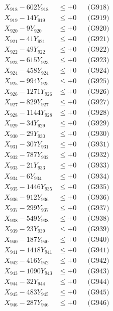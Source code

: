 \documentclass[a4paper,10pt]{article}
\begin{document}
{\begin{align}
X_{918} - 602Y_{918} &\leq +0 && \text{(G918)} \\
X_{919} - 14Y_{919} &\leq +0 && \text{(G919)} \\
X_{920} - 9Y_{920} &\leq +0 && \text{(G920)} \\
\allowbreak
X_{921} - 41Y_{921} &\leq +0 && \text{(G921)} \\
X_{922} - 49Y_{922} &\leq +0 && \text{(G922)} \\
X_{923} - 615Y_{923} &\leq +0 && \text{(G923)} \\
X_{924} - 458Y_{924} &\leq +0 && \text{(G924)} \\
X_{925} - 994Y_{925} &\leq +0 && \text{(G925)} \\
X_{926} - 1271Y_{926} &\leq +0 && \text{(G926)} \\
X_{927} - 829Y_{927} &\leq +0 && \text{(G927)} \\
X_{928} - 1144Y_{928} &\leq +0 && \text{(G928)} \\
X_{929} - 34Y_{929} &\leq +0 && \text{(G929)} \\
X_{930} - 29Y_{930} &\leq +0 && \text{(G930)} \\
\allowbreak
X_{931} - 307Y_{931} &\leq +0 && \text{(G931)} \\
X_{932} - 787Y_{932} &\leq +0 && \text{(G932)} \\
X_{933} - 21Y_{933} &\leq +0 && \text{(G933)} \\
X_{934} - 6Y_{934} &\leq +0 && \text{(G934)} \\
X_{935} - 1446Y_{935} &\leq +0 && \text{(G935)} \\
X_{936} - 912Y_{936} &\leq +0 && \text{(G936)} \\
X_{937} - 299Y_{937} &\leq +0 && \text{(G937)} \\
X_{938} - 549Y_{938} &\leq +0 && \text{(G938)} \\
X_{939} - 23Y_{939} &\leq +0 && \text{(G939)} \\
X_{940} - 187Y_{940} &\leq +0 && \text{(G940)} \\
\allowbreak
X_{941} - 1418Y_{941} &\leq +0 && \text{(G941)} \\
X_{942} - 416Y_{942} &\leq +0 && \text{(G942)} \\
X_{943} - 1090Y_{943} &\leq +0 && \text{(G943)} \\
X_{944} - 32Y_{944} &\leq +0 && \text{(G944)} \\
X_{945} - 483Y_{945} &\leq +0 && \text{(G945)} \\
X_{946} - 287Y_{946} &\leq +0 && \text{(G946)} \\

\end{align}}
\end{document}
